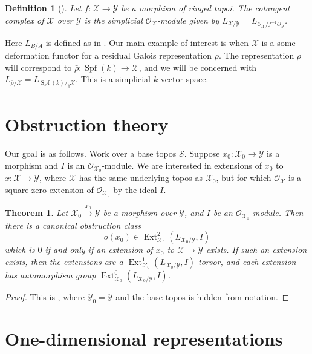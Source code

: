 \documentclass{article}
\DeclareMathOperator{\ext}{Ext}
\DeclareMathOperator{\spf}{Spf}
\newcommand{\cS}{\mathcal{S}}
\newcommand{\cX}{\mathcal{X}}
\newcommand{\cY}{\mathcal{Y}}
\newcommand{\sO}{\mathscr{O}}
\newtheorem{definition}[subsection]{Definition}
\newtheorem{theorem}[subsection]{Theorem}
\begin{document}
\begin{definition}[{\cite[II 1.2.7]{illusie-1971}}]
Let $f:\cX\to \cY$ be a morphism of ringed topoi. The \emph{cotangent complex} 
of $\cX$ over $\cY$ is the simplicial $\sO_\cX$-module given by 
$L_{\cX/\cY} = L_{\sO_\cX/f^{-1} \sO_\cY}$. 
\end{definition}

Here $L_{B/A}$ is defined as in \cite[II 1.2]{illusie-1971}. Our main example 
of interest is when $\cX$ is a some deformation functor for a residual Galois 
representation $\bar\rho$. The representation $\bar\rho$ will correspond to 
$\bar\rho:\spf(k)\to\cX$, and we will be concerned with 
$L_{\bar\rho/\cX} = L_{\spf(k)/_{\bar\rho}\cX}$. This is a simplicial 
$k$-vector space. 





\section{Obstruction theory}

Our goal is as follows. Work over a base topos $\cS$. Suppose 
$x_0:\cX_0\to \cY$ is a morphism and $I$ is an $\sO_{\cX_0}$-module. We are 
interested in extensions of $x_0$ to $x:\cX\to \cY$, where $\cX$ has the same 
underlying topos as $\cX_0$, but for which $\sO_\cX$ is a square-zero extension 
of $\sO_{\cX_0}$ by the ideal $I$. 

\begin{theorem}
Let $\cX_0\xrightarrow{x_0}\cY$ be a morphism over $\cY$, and $I$ be an 
$\sO_{\cX_0}$-module. Then there is a canonical \emph{obstruction class} 
\[
  o(x_0)\in \ext_{\cX_0}^2(L_{\cX_0/\cY},I) 
\]
which is $0$ if and only if an extension of $x_0$ to $\cX\to \cY$ exists. If 
such an extension exists, then the extensions are a 
$\ext_{\cX_0}^1(L_{\cX_0/\cY},I)$-torsor, and each extension has automorphism 
group $\ext_{\cX_0}^0(L_{\cX_0/\cY},I)$. 
\end{theorem}
\begin{proof}
This is \cite[III 2.1.7]{illusie-1971}, where $\cY_0=\cY$ and the base topos is 
hidden from notation.  
\end{proof}





\section{One-dimensional representations}
\end{document}
